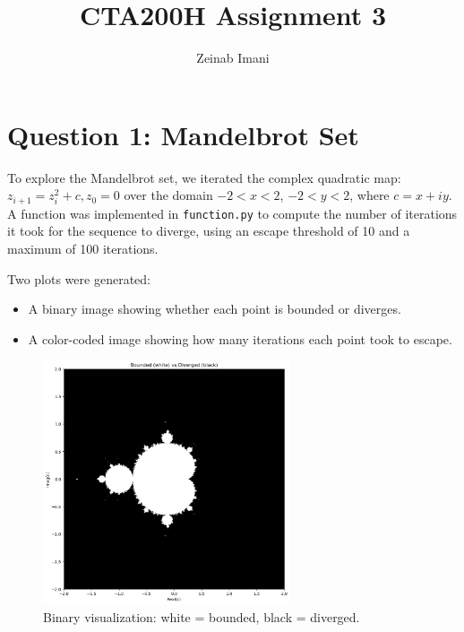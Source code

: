 \documentclass[12pt]{article}
\title{CTA200H Assignment 3}
\author{Zeinab Imani}
\date{}
\begin{document}
\maketitle

\section*{Question 1: Mandelbrot Set}

To explore the Mandelbrot set, we iterated the complex quadratic map:
$ z_{i+1} = z_i^2 + c, z_0 = 0 $
over the domain \( -2 < x < 2 \), \( -2 < y < 2 \), where \( c = x + iy \). A function was implemented in \texttt{function.py} to compute the number of iterations it took for the sequence to diverge, using an escape threshold of 10 and a maximum of 100 iterations.

Two plots were generated:
\begin{itemize}
    \item A binary image showing whether each point is bounded or diverges.
    \item A color-coded image showing how many iterations each point took to escape.
\end{itemize}

\begin{figure}[H]
    \centering
    \includegraphics[width=0.65\textwidth]{download.png}
        \caption{Binary visualization: white = bounded, black = diverged.}
\end{figure}
\end{document}
